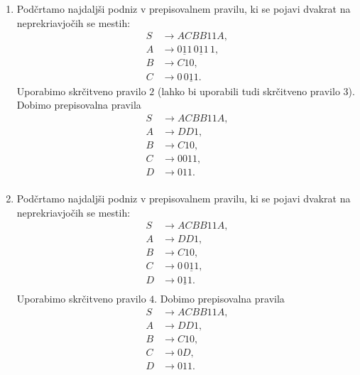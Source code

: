 \documentclass[fin1, tisk]{fmfdelo}
\theoremstyle{definition}
\begin{document}
\begin{primer}
\begin{enumerate}
        \item Podčrtamo najdaljši podniz v prepisovalnem pravilu, ki se pojavi
        dvakrat na neprekriavjočih se mestih:
        \begin{align*}
            S &\rightarrow ACBB11A, \\
            A &\rightarrow \underline{011} \, \underline{011} \, 1, \\
            B &\rightarrow C10, \\
            C &\rightarrow 0 \, \underline{011}.
        \end{align*}
        Uporabimo skrčitveno pravilo $2$ (lahko bi uporabili tudi skrčitveno pravilo $3$).
        Dobimo prepisovalna pravila
        \begin{align*}
            S &\rightarrow ACBB11A, \\
            A &\rightarrow DD1, \\
            B &\rightarrow C10, \\
            C &\rightarrow 0011, \\
            D &\rightarrow 011. \\
        \end{align*}

        \item Podčrtamo najdaljši podniz v prepisovalnem pravilu, ki se pojavi
        dvakrat na neprekriavjočih se mestih:
        \begin{align*}
            S &\rightarrow ACBB11A, \\
            A &\rightarrow DD1, \\
            B &\rightarrow C10, \\
            C &\rightarrow 0 \, \underline{011}, \\
            D &\rightarrow \underline{011}. \\
        \end{align*}
        Uporabimo skrčitveno pravilo $4$. Dobimo prepisovalna pravila
        \begin{align*}
            S &\rightarrow ACBB11A, \\
            A &\rightarrow DD1, \\
            B &\rightarrow C10, \\
            C &\rightarrow 0D, \\
            D &\rightarrow 011. \\
        \end{align*}


\end{enumerate}
\end{primer}
\end{document}
